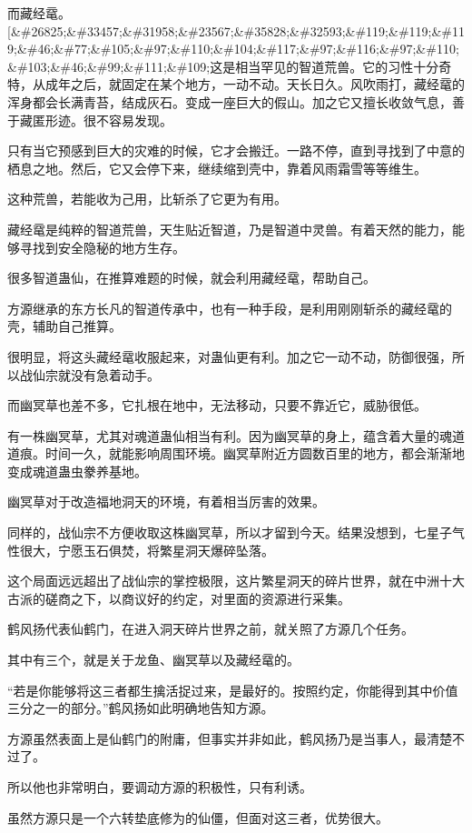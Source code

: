 \begin{this_body}
而藏经鼋。[\&\#26825;\&\#33457;\&\#31958;\&\#23567;\&\#35828;\&\#32593;\&\#119;\&\#119;\&\#119;\&\#46;\&\#77;\&\#105;\&\#97;\&\#110;\&\#104;\&\#117;\&\#97;\&\#116;\&\#97;\&\#110;\&\#103;\&\#46;\&\#99;\&\#111;\&\#109;这是相当罕见的智道荒兽。它的习性十分奇特，从成年之后，就固定在某个地方，一动不动。天长日久。风吹雨打，藏经鼋的浑身都会长满青苔，结成灰石。变成一座巨大的假山。加之它又擅长收敛气息，善于藏匿形迹。很不容易发现。

只有当它预感到巨大的灾难的时候，它才会搬迁。一路不停，直到寻找到了中意的栖息之地。然后，它又会停下来，继续缩到壳中，靠着风雨霜雪等等维生。

这种荒兽，若能收为己用，比斩杀了它更为有用。

藏经鼋是纯粹的智道荒兽，天生贴近智道，乃是智道中灵兽。有着天然的能力，能够寻找到安全隐秘的地方生存。

很多智道蛊仙，在推算难题的时候，就会利用藏经鼋，帮助自己。

方源继承的东方长凡的智道传承中，也有一种手段，是利用刚刚斩杀的藏经鼋的壳，辅助自己推算。

很明显，将这头藏经鼋收服起来，对蛊仙更有利。加之它一动不动，防御很强，所以战仙宗就没有急着动手。

而幽冥草也差不多，它扎根在地中，无法移动，只要不靠近它，威胁很低。

有一株幽冥草，尤其对魂道蛊仙相当有利。因为幽冥草的身上，蕴含着大量的魂道道痕。时间一久，就能影响周围环境。幽冥草附近方圆数百里的地方，都会渐渐地变成魂道蛊虫豢养基地。

幽冥草对于改造福地洞天的环境，有着相当厉害的效果。

同样的，战仙宗不方便收取这株幽冥草，所以才留到今天。结果没想到，七星子气性很大，宁愿玉石俱焚，将繁星洞天爆碎坠落。

这个局面远远超出了战仙宗的掌控极限，这片繁星洞天的碎片世界，就在中洲十大古派的磋商之下，以商议好的约定，对里面的资源进行采集。

鹤风扬代表仙鹤门，在进入洞天碎片世界之前，就关照了方源几个任务。

其中有三个，就是关于龙鱼、幽冥草以及藏经鼋的。

“若是你能够将这三者都生擒活捉过来，是最好的。按照约定，你能得到其中价值三分之一的部分。”鹤风扬如此明确地告知方源。

方源虽然表面上是仙鹤门的附庸，但事实并非如此，鹤风扬乃是当事人，最清楚不过了。

所以他也非常明白，要调动方源的积极性，只有利诱。

虽然方源只是一个六转垫底修为的仙僵，但面对这三者，优势很大。


\end{this_body}
